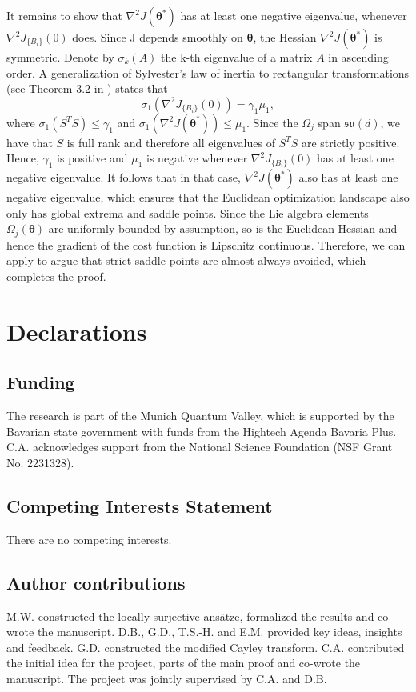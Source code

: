\documentclass{article}
\renewcommand{\vec}[1]{\ensuremath{\boldsymbol{#1}}}
\begin{document}
It remains to show that \(\nabla^2 J (\vec{\theta^*})\) has at least one negative eigenvalue, whenever \(\nabla^2 J_{\{B_i\}}(0)\) does.
Since J depends smoothly on \(\vec{\theta}\), the Hessian \(\nabla^2 J (\vec{\theta^*})\) is symmetric.
Denote by \(\sigma_k(A)\) the k-th eigenvalue of a matrix \(A\) in ascending order.
A generalization of Sylvester's law of inertia to rectangular transformations (see Theorem 3.2 in \cite{higham_modifying_1998}) states that
\begin{equation}
    \sigma_1(\nabla^2 J_{\{B_i\}}(0)) = \gamma_1 \mu_1,
\end{equation}
where \(\sigma_1(S^TS) \leq \gamma_1\) and \(\sigma_1(\nabla^2 J (\vec{\theta^*})) \leq \mu_1\).
Since the \(\Omega_j\) span \(\mathfrak{su}(d)\), we have that \(S\) is full rank and therefore all eigenvalues of \(S^T S\) are strictly positive.
Hence, \(\gamma_1\) is positive and \(\mu_1\) is negative whenever \(\nabla^2 J_{\{B_i\}}(0)\) has at least one negative eigenvalue.
It follows that in that case, \(\nabla^2 J (\vec{\theta^*})\) also has at least one negative eigenvalue, which ensures that the Euclidean optimization landscape also only has global extrema and saddle points.
Since the Lie algebra elements \(\Omega_j(\vec{\theta})\) are uniformly bounded by assumption, so is the Euclidean Hessian and hence the gradient of the cost function is Lipschitz continuous.
Therefore, we can apply  to argue that strict saddle points are almost always avoided, which completes the proof.

\section*{Declarations}
\subsection*{Funding}
The research is part of the Munich Quantum Valley, which is supported by the Bavarian state government with funds from the Hightech Agenda Bavaria Plus. C.A. acknowledges support from the National Science Foundation (NSF Grant No. 2231328).  

\subsection*{Competing Interests Statement}
There are no competing interests.

\subsection*{Author contributions}
M.W. constructed the locally surjective ansätze, formalized the results and co-wrote the manuscript. D.B., G.D., T.S.-H. and E.M. provided key ideas, insights and feedback. G.D. constructed the modified Cayley transform. C.A. contributed the initial idea for the project, parts of the main proof and co-wrote the manuscript. The project was jointly supervised by C.A. and D.B.
\end{document}
